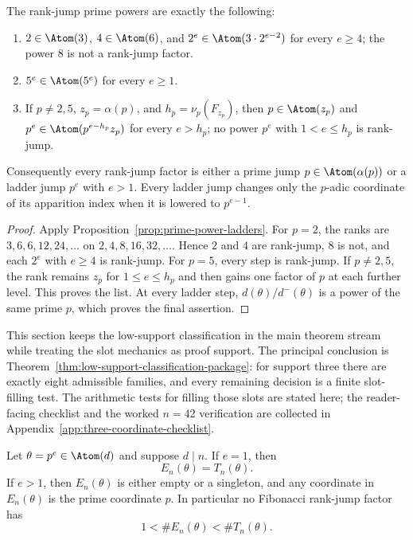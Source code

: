 \begin{corollary}\label{cor:rank-jump-classification}
The rank-jump prime powers are exactly the following:
\begin{enumerate}[label=(\roman*)]
\item $2\in\Atom(3)$, $4\in\Atom(6)$, and
$2^e\in\Atom(3\cdot2^{e-2})$ for every $e\ge4$; the power $8$ is not a rank-jump factor.
\item $5^e\in\Atom(5^e)$ for every $e\ge1$.
\item If $p\ne2,5$, $z_p=\alpha(p)$, and
$h_p=\nu_p(F_{z_p})$, then $p\in\Atom(z_p)$ and
$p^e\in\Atom(p^{e-h_p}z_p)$ for every $e>h_p$; no power $p^e$ with
$1<e\le h_p$ is rank-jump.
\end{enumerate}
Consequently every rank-jump factor is either a prime jump $p\in\Atom(\alpha(p))$ or a
ladder jump $p^e$ with $e>1$. Every ladder jump changes only the $p$-adic
coordinate of its apparition index when it is lowered to $p^{e-1}$.
\end{corollary}

\begin{proof}
Apply Proposition~\ref{prop:prime-power-ladders}. For $p=2$, the ranks are
$3,6,6,12,24,\ldots$ on $2,4,8,16,32,\ldots$. Hence $2$ and $4$ are rank-jump,
$8$ is not, and each $2^e$ with $e\ge4$ is rank-jump. For $p=5$, every step is
rank-jump. If $p\ne2,5$, the rank remains $z_p$ for $1\le e\le h_p$ and then
gains one factor of $p$ at each further level. This proves the list. At every
ladder step, $d(\theta)/d^-(\theta)$ is a power of the same prime $p$, which
proves the final assertion.
\end{proof}

This section keeps the low-support classification in the main theorem stream
while treating the slot mechanics as proof support. The principal conclusion is
Theorem~\ref{thm:low-support-classification-package}: for support three there
are exactly eight admissible families, and every remaining decision is a finite
slot-filling test.  The arithmetic tests for filling those slots are stated here;
the reader-facing checklist and the worked $n=42$ verification are collected in
Appendix~\ref{app:three-coordinate-checklist}.

\begin{lemma}\label{thm:primitive-ladder-dichotomy}
Let $\theta=p^e\in\Atom(d)$ and suppose $d\mid n$. If $e=1$, then
\[
E_n(\theta)=T_n(\theta).
\]
If $e>1$, then $E_n(\theta)$ is either empty or a singleton, and any
coordinate in $E_n(\theta)$ is the prime coordinate $p$. In particular no
Fibonacci rank-jump factor has
\[
1<\#E_n(\theta)<\#T_n(\theta).
\]
\end{lemma}

